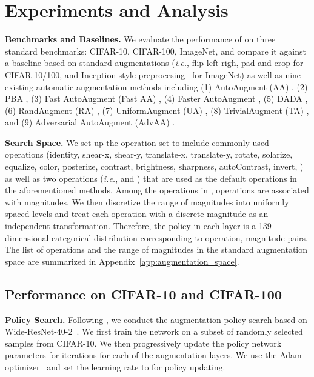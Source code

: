 
\section{Experiments and Analysis}
\textbf{Benchmarks and Baselines.} We evaluate the performance of \DAA{} on three standard benchmarks: CIFAR-10, CIFAR-100, ImageNet, and compare it against a baseline based on standard augmentations (\textit{i.e.}, flip left-righ, pad-and-crop for CIFAR-10/100, and Inception-style preprocesing~\citep{szegedy2015going} for ImageNet) as well as nine existing automatic augmentation methods including (1) AutoAugment (AA) \citep{cubuk2019autoaugment}, (2) PBA \citep{ho2019population}, (3) Fast AutoAugment (Fast AA) \citep{lim2019fast}, (4) Faster AutoAugment \citep{hataya2020faster}, (5) DADA \citep{li2020differentiable}, (6) RandAugment (RA) \citep{cubuk2020randaugment}, (7) UniformAugment (UA) \citep{lingchen2020uniformaugment}, (8) TrivialAugment (TA) \citep{muller2021trivialaugment}, and (9) Adversarial AutoAugment (AdvAA) \citep{zhang2019adversarial}. 


\textbf{Search Space.} We set up the operation set  to include  commonly used operations (identity, shear-x, shear-y, translate-x, translate-y, rotate, solarize, equalize, color, posterize, contrast, brightness, sharpness, autoContrast, invert, \randCutout{}) as well as two operations (\textit{i.e.}, \randFlip{} and \randCrop{}) that are used as the default operations in the aforementioned methods.
Among the operations in ,  operations are associated with magnitudes.
We then discretize the range of magnitudes into  uniformly spaced levels and treat each operation with a discrete magnitude as an independent transformation. Therefore, the policy in each layer is a 139-dimensional categorical distribution corresponding to  operation, magnitude pairs. The list of operations and the range of magnitudes in the standard augmentation space are summarized in Appendix~\ref{app:augmentation_space}.


\subsection{Performance on CIFAR-10 and CIFAR-100}
\textbf{Policy Search.} 
Following \citep{cubuk2019autoaugment}, we conduct the augmentation policy search based on Wide-ResNet-40-2~\citep{zagoruyko2016wide}. We first train the network on a subset of  randomly selected samples from CIFAR-10. We then progressively update the policy network parameters  for  iterations for each of the  augmentation layers. We use the Adam optimizer~\citep{kingma2014adam} and set the learning rate to  for policy updating. 



